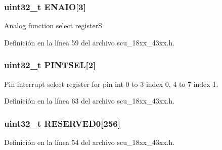 \subsubsection[{\texorpdfstring{E\+N\+A\+IO}{ENAIO}}]{ uint32\+\_\+t E\+N\+A\+IO\mbox{[}3\mbox{]}}\hypertarget{struct_l_p_c___s_c_u___t_a25ebb617d64b2c0d22ebfb1c97a65dbb}{}\label{struct_l_p_c___s_c_u___t_a25ebb617d64b2c0d22ebfb1c97a65dbb}
Analog function select registerS 

Definición en la línea 59 del archivo scu\+\_\+18xx\+\_\+43xx.\+h.

\subsubsection[{\texorpdfstring{P\+I\+N\+T\+S\+EL}{PINTSEL}}]{ uint32\+\_\+t P\+I\+N\+T\+S\+EL\mbox{[}2\mbox{]}}\hypertarget{struct_l_p_c___s_c_u___t_a8ef8b92ccfb8598c38506400a44c1d4e}{}\label{struct_l_p_c___s_c_u___t_a8ef8b92ccfb8598c38506400a44c1d4e}
Pin interrupt select register for pin int 0 to 3 index 0, 4 to 7 index 1. 

Definición en la línea 63 del archivo scu\+\_\+18xx\+\_\+43xx.\+h.

\subsubsection[{\texorpdfstring{R\+E\+S\+E\+R\+V\+E\+D0}{RESERVED0}}]{ uint32\+\_\+t R\+E\+S\+E\+R\+V\+E\+D0\mbox{[}256\mbox{]}}\hypertarget{struct_l_p_c___s_c_u___t_a22b6629c292698a196a20e7c7541e3a9}{}\label{struct_l_p_c___s_c_u___t_a22b6629c292698a196a20e7c7541e3a9}


Definición en la línea 54 del archivo scu\+\_\+18xx\+\_\+43xx.\+h.

